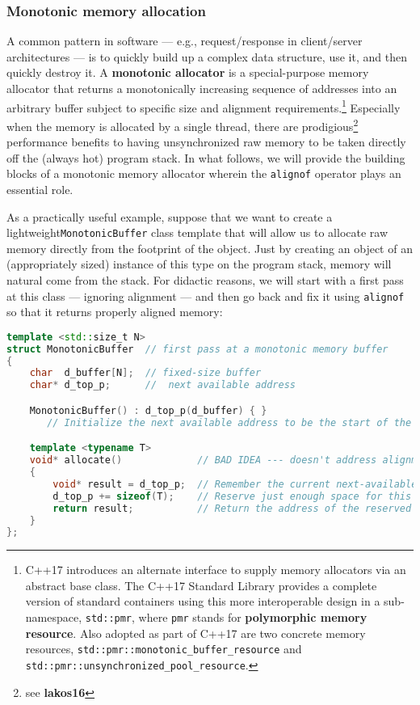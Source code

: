 \subsubsection[Monotonic memory allocation]{Monotonic memory allocation}\label{monotonic-memory-allocation}

A common pattern in software --- e.g., request/response in client/server
architectures --- is to quickly build up a complex data structure,
use it, and then quickly destroy it. A \textbf{monotonic allocator} is
a special-purpose memory allocator that returns a monotonically
increasing sequence of addresses into an arbitrary buffer subject to
specific size and alignment requirements.{\cprotect\footnote{C++17
introduces an alternate interface to supply memory allocators via an
abstract base class. The C++17 Standard Library provides a complete
version of standard containers using this more interoperable design in
a sub-namespace, \texttt{std::pmr}, where \texttt{pmr} stands for
\textbf{polymorphic memory resource}. Also adopted as part of C++17
are two concrete memory resources,
\texttt{std::pmr::monotonic\_buffer\_resource} and
  \texttt{std::pmr::unsynchronized\_pool\_resource}.}} Especially when
the memory is allocated by a single thread, there are prodigious\footnote{see
\textbf{lakos16}} performance benefits to having unsynchronized raw
memory to be taken directly off the (always hot) program stack. In what
follows, we will provide the building blocks of a monotonic memory
allocator wherein the \texttt{alignof} operator plays an essential role.

As a practically useful example, suppose that we want to create a
lightweight\linebreak[4] \mbox{\texttt{MonotonicBuffer}} class template that will allow us
to allocate raw memory directly from the footprint of the object. Just
by creating an object of an (appropriately sized) instance of this type
on the program stack, memory will natural come from the stack. For
didactic reasons, we will start with a first pass at this class ---
ignoring alignment --- and then go back and fix it using
\texttt{alignof} so that it returns properly aligned memory:

\begin{lstlisting}[language=C++]
template <std::size_t N>
struct MonotonicBuffer  // first pass at a monotonic memory buffer
{
    char  d_buffer[N];  // fixed-size buffer
    char* d_top_p;      //  next available address

    MonotonicBuffer() : d_top_p(d_buffer) { }
       // Initialize the next available address to be the start of the buffer.

    template <typename T>
    void* allocate()             // BAD IDEA --- doesn't address alignment
    {
        void* result = d_top_p;  // Remember the current next-available address.
        d_top_p += sizeof(T);    // Reserve just enough space for this type.
        return result;           // Return the address of the reserved space.
    }
};
\end{lstlisting}
    
